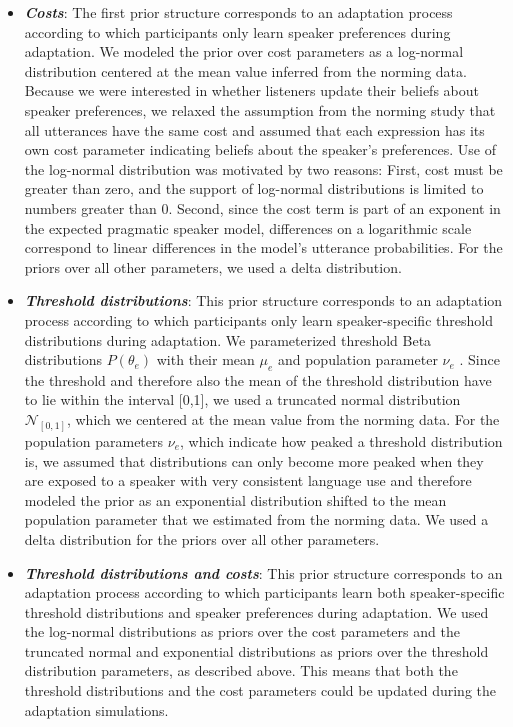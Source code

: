 \documentclass[man, floatsintext]{apa6}
\begin{document}
\begin{itemize}
\item \textbf{\textit{Costs}}: The first prior structure corresponds to an adaptation process according to which participants only learn speaker preferences during adaptation. 
We modeled the prior over cost parameters  as a log-normal distribution centered at the mean value inferred from the norming data. Because we were interested in whether listeners update their beliefs about speaker preferences, we relaxed the assumption from the norming study that all utterances have the same cost and assumed that each expression has its own cost parameter indicating beliefs about the speaker's preferences. Use of the log-normal distribution was motivated by two reasons: First, cost must be greater than zero, and the support of log-normal distributions is limited to numbers greater than 0. Second, since the cost term is part of an exponent in the expected pragmatic speaker model, differences on a logarithmic scale correspond to linear differences in the model's utterance probabilities. For the priors over all other parameters, we used a delta distribution.
\item \textbf{\textit{Threshold distributions}}:  This prior structure corresponds to an adaptation process according to which participants only learn speaker-specific threshold distributions during adaptation. We parameterized threshold Beta distributions $P(\theta_e)$ with their mean $\mu_e$ and population parameter $\nu_e$ \parencite{Kruschke2015}. Since the threshold and therefore also the mean of the threshold distribution have to lie within the interval [0,1], we used a truncated normal distribution $\mathscr{N}_{[0,1]}$, which we centered at the mean value from the norming data. For the population parameters $\nu_e$, which indicate how peaked a threshold distribution is, we assumed that distributions can only become more peaked when they are exposed to a speaker with very consistent language use and therefore modeled the prior as an exponential distribution shifted to the mean population parameter that we estimated from the norming data. We used a delta distribution for the priors over all other parameters.
\item  \textbf{\textit{Threshold distributions and costs}}:   This prior structure corresponds to an adaptation process according to which participants learn both speaker-specific threshold distributions and speaker preferences during adaptation.  We used the log-normal distributions as priors over the cost parameters and the truncated normal and exponential distributions as priors over the threshold distribution parameters, as described above. This means that both the threshold distributions and the cost parameters could be updated during the adaptation simulations.
\end{itemize}
\end{document}
